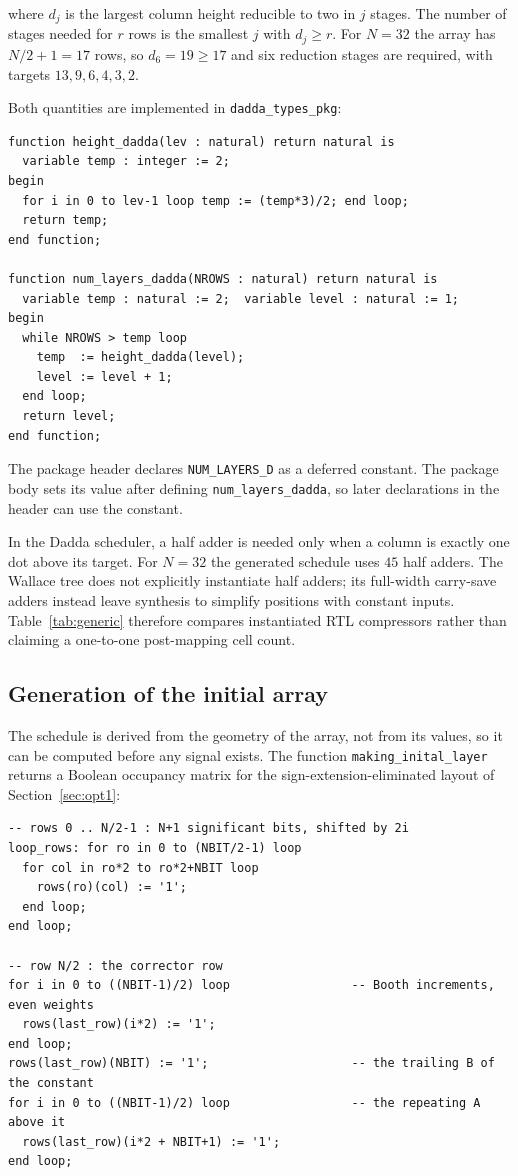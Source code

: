 \documentclass[11pt,a4paper]{article}
\begin{document}
where $d_j$ is the largest column height reducible to two in $j$ stages. The
number of stages needed for $r$ rows is the smallest $j$ with $d_j \geq r$. For
$N=32$ the array has $N/2+1 = 17$ rows, so $d_6 = 19 \geq 17$ and six reduction
stages are required, with targets $13, 9, 6, 4, 3, 2$.

Both quantities are implemented in \texttt{dadda\_types\_pkg}:

\begin{lstlisting}[style=vhdl]
function height_dadda(lev : natural) return natural is
  variable temp : integer := 2;
begin
  for i in 0 to lev-1 loop temp := (temp*3)/2; end loop;
  return temp;
end function;

function num_layers_dadda(NROWS : natural) return natural is
  variable temp : natural := 2;  variable level : natural := 1;
begin
  while NROWS > temp loop
    temp  := height_dadda(level);
    level := level + 1;
  end loop;
  return level;
end function;
\end{lstlisting}

The package header declares \texttt{NUM\_LAYERS\_D} as a deferred constant.
The package body sets its value after defining \texttt{num\_layers\_dadda}, so
later declarations in the header can use the constant.

In the Dadda scheduler, a half adder is needed only when a column is exactly one
dot above its target. For $N=32$ the generated schedule uses $45$ half adders.
The Wallace tree does not explicitly instantiate half adders; its
full-width carry-save adders instead leave synthesis to simplify positions with
constant inputs. Table~\ref{tab:generic} therefore compares instantiated RTL
compressors rather than claiming a one-to-one post-mapping cell count.

\subsection{Generation of the initial array}

The schedule is derived from the geometry of the array, not from its values, so
it can be computed before any signal exists. The function
\texttt{making\_inital\_layer} returns a Boolean occupancy matrix for the
sign-extension-eliminated layout of Section~\ref{sec:opt1}:

\begin{lstlisting}[style=vhdl]
-- rows 0 .. N/2-1 : N+1 significant bits, shifted by 2i
loop_rows: for ro in 0 to (NBIT/2-1) loop
  for col in ro*2 to ro*2+NBIT loop
    rows(ro)(col) := '1';
  end loop;
end loop;

-- row N/2 : the corrector row
for i in 0 to ((NBIT-1)/2) loop                 -- Booth increments, even weights
  rows(last_row)(i*2) := '1';
end loop;
rows(last_row)(NBIT) := '1';                    -- the trailing B of the constant
for i in 0 to ((NBIT-1)/2) loop                 -- the repeating A above it
  rows(last_row)(i*2 + NBIT+1) := '1';
end loop;
\end{lstlisting}
\end{document}

